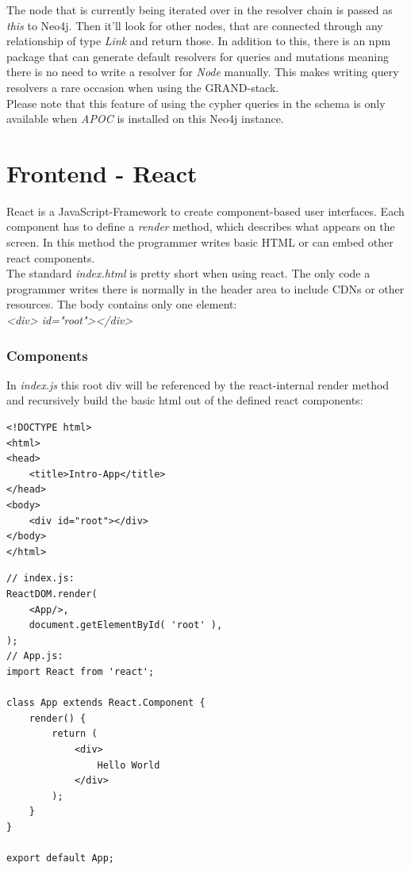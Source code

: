 The node that is currently being iterated over in the resolver chain is passed as \emph{this} to Neo4j. Then it'll look for other nodes, that are connected through any relationship of type \emph{Link} and return those. In addition to this, there is an npm package that can generate default resolvers for queries and mutations meaning there is no need to write a resolver for \emph{Node} manually. This makes writing query resolvers a rare occasion when using the GRAND-stack. \\

Please note that this feature of using the cypher queries in the schema is only available when \emph{APOC} is installed on this Neo4j instance.

\newpage
\section{Frontend - React}
React is a JavaScript-Framework to create component-based user interfaces. Each component has to define a \emph{render} method, which describes what appears on the screen. In this method the programmer writes basic HTML or can embed other react components. \\
The standard \emph{index.html} is pretty short when using react. The only code a programmer writes there is normally in the header area to include CDNs or other resources. The body contains only one element: \\
\emph{<div> id="root"></div>} 

\subsubsection{Components}
In \emph{index.js} this root div will be referenced by the react-internal render method and recursively build the basic html out of the defined react components:
\lstset{language=HTML}
\begin{lstlisting}[caption={index.html for Hello World},label={ex250}]
<!DOCTYPE html>
<html>
<head>
	<title>Intro-App</title>
</head>
<body>
	<div id="root"></div>
</body>
</html>
\end{lstlisting}

\lstset{language=JavaScript}
\begin{lstlisting}[caption={Hello World in React},label={ex251}]
// index.js:
ReactDOM.render(
	<App/>,
	document.getElementById( 'root' ),
);
// App.js:
import React from 'react';

class App extends React.Component {
	render() {
		return (
			<div>
				Hello World
			</div>
		);
	}
}

export default App;
\end{lstlisting}

